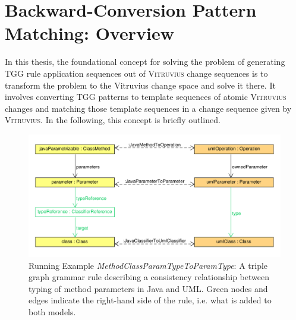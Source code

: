 \section{Backward-Conversion Pattern Matching: Overview}
\label{sec:Concept:BackwardConversionPM}
In this thesis, the foundational concept for solving the problem of generating TGG rule application sequences out of \textsc{Vitruvius} change sequences is to transform the problem to the Vitruvius change space and solve it there. 
It involves converting TGG patterns to template sequences of atomic \textsc{Vitruvius} changes and matching those template sequences in a change sequence given by \textsc{Vitruvius}. 
In the following, this concept is briefly outlined.

\begin{figure}
\centering
\includegraphics[width=15cm]{figures/tggRule_methodClassParamTypeToParamType.pdf}
\caption[Running Example \emph{MethodClassParamTypeToParamType}]{Running Example \emph{MethodClassParamTypeToParamType}: A triple graph grammar rule describing a consistency relationship between typing of method parameters in Java and UML. Green nodes and edges indicate the right-hand side of the rule, i.e. what is added to both models.}
\label{fig:tggRule_methodClassParamTypeToParamType}
\end{figure}


